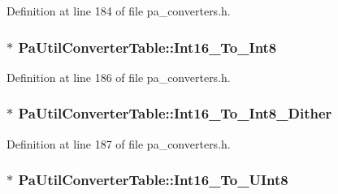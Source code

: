 Definition at line 184 of file pa\+\_\+converters.\+h.

\subsubsection[{\texorpdfstring{Int16\+\_\+\+To\+\_\+\+Int8}{Int16_To_Int8}}]{$\ast$ Pa\+Util\+Converter\+Table\+::\+Int16\+\_\+\+To\+\_\+\+Int8}\hypertarget{struct_pa_util_converter_table_ab9be9617571f652b36a568dcf96ce8dd}{}\label{struct_pa_util_converter_table_ab9be9617571f652b36a568dcf96ce8dd}


Definition at line 186 of file pa\+\_\+converters.\+h.

\subsubsection[{\texorpdfstring{Int16\+\_\+\+To\+\_\+\+Int8\+\_\+\+Dither}{Int16_To_Int8_Dither}}]{$\ast$ Pa\+Util\+Converter\+Table\+::\+Int16\+\_\+\+To\+\_\+\+Int8\+\_\+\+Dither}\hypertarget{struct_pa_util_converter_table_a31a224c28be90b537292f603736153b9}{}\label{struct_pa_util_converter_table_a31a224c28be90b537292f603736153b9}


Definition at line 187 of file pa\+\_\+converters.\+h.

\subsubsection[{\texorpdfstring{Int16\+\_\+\+To\+\_\+\+U\+Int8}{Int16_To_UInt8}}]{$\ast$ Pa\+Util\+Converter\+Table\+::\+Int16\+\_\+\+To\+\_\+\+U\+Int8}\hypertarget{struct_pa_util_converter_table_a7f5e61b0513db80bacd3979626eae18e}{}\label{struct_pa_util_converter_table_a7f5e61b0513db80bacd3979626eae18e}


